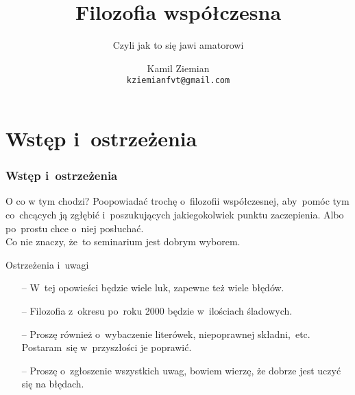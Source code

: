 \documentclass{beamer}  %
\title[Filozofia współczesna]{Filozofia współczesna}
\subtitle{Czyli jak to się jawi amatorowi}
\author{Kamil Ziemian \\
  \texttt{kziemianfvt@gmail.com}}
\institute{Uniwersytet Jagielloński w~Krakowie, \\
  Wydział Fizyki, Astronomii i~Informatyki Stosowanej}
\begin{document}



\begin{frame}
  \titlepage
\end{frame}



\section[]{Wstęp i~ostrzeżenia}



\begin{frame}
  \frametitle{Wstęp i~ostrzeżenia}

  \begin{block}{O co w tym chodzi?}
    Poopowiadać trochę o~filozofii współczesnej, aby~pomóc tym
    co~chcących ją zgłębić i~poszukujących jakiegokolwiek punktu
    zaczepienia. Albo po~prostu chce o~niej posłuchać. \\
    Co nie znaczy, że~to seminarium jest dobrym wyborem.
  \end{block}

  \begin{block}{Ostrzeżenia i~uwagi}
    \begin{itemize}
    \item[--] W~tej opowieści będzie wiele luk, zapewne też wiele
      błędów.
    \item[--] Filozofia z~okresu po~roku 2000 będzie w~ilościach
      śladowych.
    \item[--] Proszę również o~wybaczenie literówek, niepoprawnej
      składni,~etc. Postaram~się w~przyszłości je poprawić.
    \item[--] Proszę o~zgłoszenie wszystkich uwag, bowiem wierzę, że
      dobrze jest uczyć się na błędach.
    \end{itemize}
  \end{block}

\end{frame}
\end{document}
